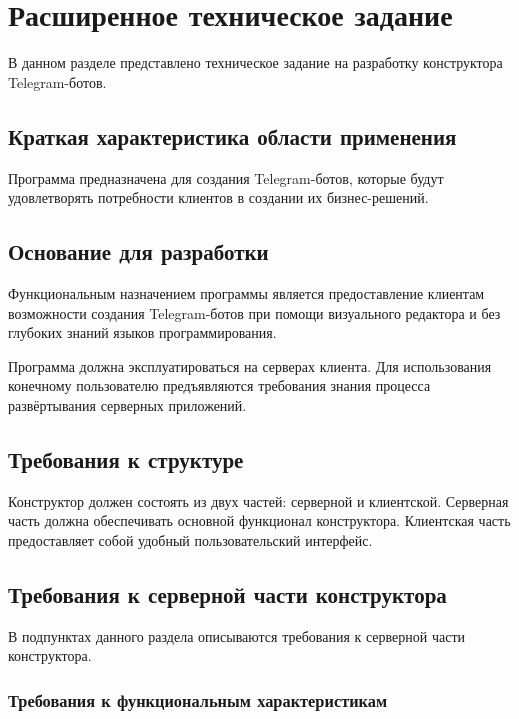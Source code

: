 
\newpage

\section{Расширенное техническое задание}

В данном разделе представлено техническое задание на разработку
конструктора Telegram-ботов.

\subsection{Краткая характеристика области применения}

Программа предназначена для создания
Telegram-ботов, которые будут удовлетворять
потребности клиентов в создании их бизнес-решений.


\subsection{Основание для разработки}

Функциональным назначением программы является предоставление
клиентам возможности создания Telegram-ботов при помощи визуального редактора и
без глубоких знаний языков программирования.

Программа должна эксплуатироваться на серверах клиента.
Для использования конечному пользователю предъявляются требования знания процесса
развёртывания серверных приложений.


\subsection{Требования к структуре}

Конструктор должен состоять из двух частей: серверной и клиентской.
Серверная часть должна обеспечивать основной функционал конструктора.
Клиентская часть предоставляет собой удобный пользовательский интерфейс.

\subsection{Требования к серверной части конструктора}

В подпунктах данного раздела описываются требования к серверной части конструктора.

\subsubsection{Требования к функциональным характеристикам}

